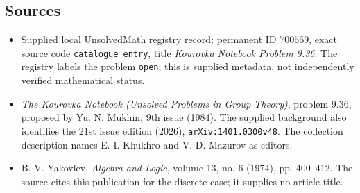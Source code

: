 \documentclass[11pt]{article}
\begin{document}
\subsection{Sources}
\begin{itemize}
\item Supplied local UnsolvedMath registry record: permanent ID \(700569\), exact source code \texttt{catalogue entry}, title \emph{Kourovka Notebook Problem 9.36}. The registry labels the problem \texttt{open}; this is supplied metadata, not independently verified mathematical status.
\item \emph{The Kourovka Notebook (Unsolved Problems in Group Theory)}, problem 9.36, proposed by Yu. N. Mukhin, 9th issue (1984). The supplied background also identifies the 21st issue edition (2026), \texttt{arXiv:1401.0300v48}. The collection description names E. I. Khukhro and V. D. Mazurov as editors.
\item B. V. Yakovlev, \emph{Algebra and Logic}, volume 13, no. 6 (1974), pp. 400--412. The source cites this publication for the discrete case; it supplies no article title.
\end{itemize}
\end{document}
